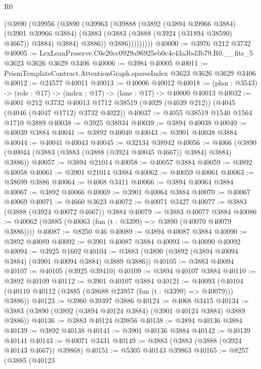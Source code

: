 \begin{lexlean}{R0}
\begin{coremodule}
              (@3890
                (@39956
                  (@3890
                    (@39963
                      (@39888
                        (@3892
                          (@3894 @39966 @3884)
                          (@3901 @39966 @3884)
                          (@3883 (@3883 (@3888 (@3924 (@31894 @38590) @4667)) @3884) @3884)
                          @3886))
                      @3886)))))))))
@40000 := @3976 @212 @3732
@40005 := LexLeanPreserve.C0e20cc0929a96925eb0c4c43a3bd3b79.R0.__fits_5 @3623 @3626 @3629 @3406
@40006 := @3984 @40005
@40011 := PrismTemplateContract.AttentionGraph.sparseIndex @3623 @3626 @3629 @3406
@40012 := @24577 @40011
@40013 := @40006 @40012
@40018 := (plan : @3543) -> (role : @17) -> (index : @17) -> (lane : @17) -> @40000 @40013
@40032 := @4001
    @212
    @3732
    @40013
    @1712
    @38519
    (@4029 (@4039 @212))
    (@4045 (@4046 (@4047 @1712) @3732 @4022))
@40037 := @4055 @38519 @1540 @1564 @1710 @3889
@40038 := @3925 @38934
@40039 := @3894 @40038
@40040 := @40039 @3884
@40041 := @3892 @40040
@40043 := @3901 @40038 @3884
@40044 := @40041 @40043
@40045 := @32134 @38942
@40056 := @4066 (@3890 (@40044 (@3883 (@3883 (@3888 (@3924 @40045 @4667)) @3884) @3884) @3886))
@40057 := @3894 @21014
@40058 := @40057 @3884
@40059 := @3892 @40058
@40061 := @3901 @21014 @3884
@40062 := @40059 @40061
@40063 := @38699 @3886
@40064 := @4068 @3411
@40066 := @3894 @40064 @3884
@40067 := @3892 @40066
@40069 := @3901 @40064 @3884
@40070 := @40067 @40069
@40071 := @4660 @3623
@40072 := @40071 @3427
@40077 := @3883 (@3888 (@3924 @40072 @4667)) @3884
@40079 := @3883 @40077 @3884
@40086 := @40062 (@3885 (@40063 (fun (t : @3399) => @3890 (@40070 @40079 @3886))))
@40087 := @8250 @46
@40089 := @3894 @40087 @3884
@40090 := @3892 @40089
@40092 := @3901 @40087 @3884
@40093 := @40090 @40092
@40094 := @3925 @1602
@40104 := @3883 (@3890 (@3892 (@3894 @40094 @3884) (@3901 @40094 @3884) @3889 @3886))
@40105 := @3883 @40094
@40107 := @40105 (@3925 @39410)
@40109 := @3894 @40107 @3884
@40110 := @3892 @40109
@40112 := @3901 @40107 @3884
@40121 := @40093 (@40104 (@40110 @40112 (@3885 (@38688 @23957 (fun (t : @3399) => @40079))) @3886))
@40123 := @3960 @39397 @3886
@40124 := @4068 @3415
@40134 := @3883 (@3890 (@3892 (@3894 @40124 @3884) (@3901 @40124 @3884) @3889 @3886))
@40136 := @3883 @40124 @39856
@40138 := @3894 @40136 @3884
@40139 := @3892 @40138
@40141 := @3901 @40136 @3884
@40142 := @40139 @40141
@40143 := @40071 @3431
@40149 := @3883 (@3883 (@3888 (@3924 @40143 @4667)) @39868)
@40151 := @5305 @40143 @39863
@40165 := @8257
    (@3885
      (@40123

\end{coremodule}
\end{lexlean}
